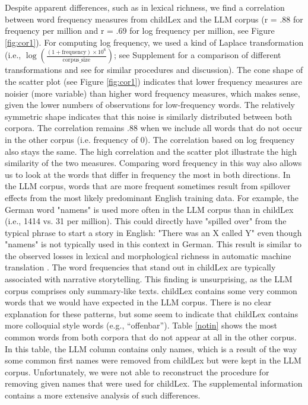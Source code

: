 \documentclass[doc, a4paper]{apa7}
\begin{document}
Despite apparent differences, such as in lexical richness, we find a correlation between word frequency measures from childLex and the LLM corpus (r = .88 for frequency per million and r = .69 for log frequency per million, see Figure \ref{fig:cor1}). For computing log frequency, we used a kind of Laplace transformation (i.e., $\log\left(\frac{(1 + \text{frequency}) \times 10^6}{\text{corpus\_size}}\right)$; see Supplement for a comparison of different transformations and see \cite{heister_dlexdb_2011, van_heuven_subtlex-uk_2014} for similar procedures and discussion). The cone shape of the scatter plot (see Figure \ref{fig:cor1}) indicates that lower frequency measures are noisier (more variable) than higher word frequency measures, which makes sense, given the lower numbers of observations for low-frequency words. The relatively symmetric shape indicates that this noise is similarly distributed between both corpora. The correlation remains .88 when we include all words that do not occur in the other corpus (i.e. frequency of 0). The correlation based on log frequency also stays the same. The high correlation and the scatter plot illustrate the high similarity of the two measures. Comparing word frequency in this way also allows us to look at the words that differ in frequency the most in both directions. In the LLM corpus, words that are more frequent sometimes result from spillover effects from the most likely predominant English training data. For example, the German word "namens" is used more often in the LLM corpus than in childLex (i.e., 1414 vs. 31 per million). This could directly have "spilled over" from the typical phrase to start a story in English: "There was an X called Y" even though "namens" is not typically used in this context in German. This result is similar to the observed losses in lexical and morphological richness in automatic machine translation \citep{vanmassenhove_machine_2021}. The word frequencies that stand out in childLex are typically associated with narrative storytelling. This finding is unsurprising, as the LLM corpus comprises only summary-like texts. childLex contains some very common words that we would have expected in the LLM corpus. There is no clear explanation for these patterns, but some seem to indicate that childLex contains more colloquial style words (e.g., “offenbar”). Table \ref{notin} shows the most common words from both corpora that do not appear at all in the other corpus. In this table, the LLM column contains only names, which is a result of the way some common first names were removed from childLex but were kept in the LLM corpus. Unfortunately, we were not able to reconstruct the procedure for removing given names that were used for childLex. The supplemental information contains a more extensive analysis of such differences. 
\end{document}

